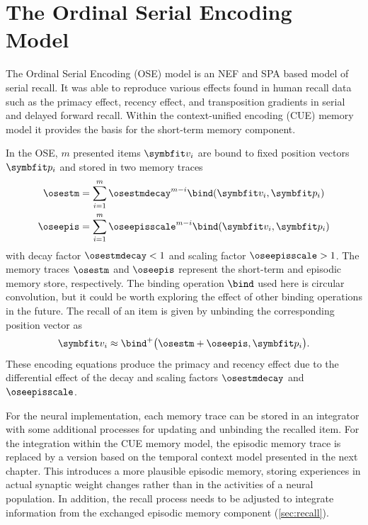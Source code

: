 \chapter{The Ordinal Serial Encoding Model}
The Ordinal Serial Encoding (OSE) model \parencite{Choo2010} is an NEF and SPA based model of serial recall.
It was able to reproduce various effects found in human recall data such as the primacy effect, recency effect, and transposition gradients in serial and delayed forward recall.
Within the context-unified encoding (CUE) memory model it provides the basis for the short-term memory component.

In the OSE, $m$ presented items $\vc v_i$ are bound to fixed position vectors $\vc p_i$ and stored in two memory traces
\begin{align}
    \osestm &= \sum_{i=1}^m \osestmdecay^{m - i} \bind(\vc v_i, \vc p_i) \\
    \oseepis &= \sum_{i=1}^m \oseepisscale^{m - i} \bind(\vc v_i, \vc p_i)
\end{align}
with decay factor $\osestmdecay < 1$ and scaling factor $\oseepisscale > 1$.
The memory traces $\osestm$ and $\oseepis$ represent the short-term and episodic memory store, respectively.
The binding operation $\bind$ used here is circular convolution, but it could be worth exploring the effect of other binding operations in the future.
The recall of an item is given by unbinding the corresponding position vector as
\begin{equation}
    \vc v_i \approx \bind^+\big(\osestm + \oseepis, \vc p_i\big) \text{.}
\end{equation}
These encoding equations produce the primacy and recency effect due to the differential effect of the decay and scaling factors $\osestmdecay$ and $\oseepisscale$.

For the neural implementation, each memory trace can be stored in an integrator with some additional processes for updating and unbinding the recalled item.
For the integration within the CUE memory model, the episodic memory trace is replaced by a version based on the temporal context model presented in the next chapter.
This introduces a more plausible episodic memory, storing experiences in actual synaptic weight changes rather than in the activities of a neural population.
In addition, the recall process needs to be adjusted to integrate information from the exchanged episodic memory component (\cref{sec:recall}).



